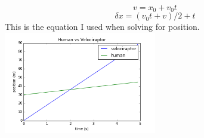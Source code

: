 \documentclass[twocolumn]{revtex4}
\begin{document}
$$v = x_0 + v_0 t$$
$$\delta x = (v_0 t + v) / 2 + t$$
This is the equation I used when solving for position.
\includegraphics[width=0.5\textwidth]{foo.png}
\end{document}
